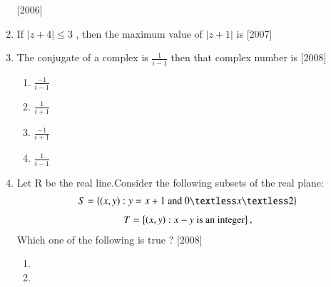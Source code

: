 \documentclass[journal,12pt,twocolumn,article]{IEEEtran}
\theoremstyle{remark}
\begin{document}
\begin{enumerate}[start = 14]
\hfill{[2006]}
\begin{enumerate}
\end{enumerate}
\item If $|z+4|\leq 3$ , then the maximum value of $|z+1|$ is
\hfill{[2007]}                                     
\begin{enumerate}                                  
\end{enumerate}
\item The conjugate of a complex is $\frac{1}{i-1}$ then that complex number is
\hfill{[2008]}
\begin{multicols}{4}
\begin{enumerate}
\item $\frac{-1}{i-1}$
\item $\frac{1}{i+1}$
\item $\frac{-1}{i+1}$
\item $\frac{1}{i-1}$
\end{enumerate}
\end{multicols}
\item Let R be the real line.Consider the following subsets of the real plane: 
\begin{align}
S=\cbrak{(x,y):y=x+1 \text{ and } 0{\textless}x{\textless}2}
\end{align}
\begin{align}
T=\left\{(x,y):x-y \text{ is an integer}\right\}, 
\end{align}
Which one of the following is true ?
\hfill{[2008]}
\begin{enumerate}
\item {}                                     
\item {}
                                

\end{enumerate}
\end{enumerate}
\end{document}
